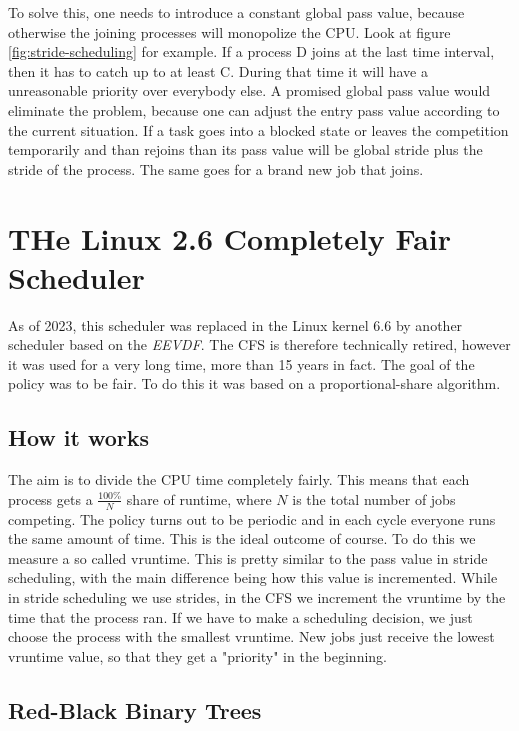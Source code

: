 To solve this, one needs to introduce a constant global pass value, because otherwise the joining processes will monopolize the CPU. 
Look at figure \ref{fig:stride-scheduling} for example.
If a process D joins at the last time interval, then it has to catch up to at least C. During that time it will have a unreasonable priority over everybody else.
A promised global pass value would eliminate the problem, because one can adjust the entry pass value according to the current situation.
If a task goes into a blocked state or leaves the competition temporarily and than rejoins than its pass value will be global stride plus the stride of the process. The same goes for a brand new job that joins.

\newpage

\section{THe Linux 2.6 Completely Fair Scheduler}

As of 2023, this scheduler was replaced in the Linux kernel 6.6 by another scheduler based on the \emph{EEVDF}.
The CFS is therefore technically retired, however it was used for a very long time, more than 15 years in fact.
The goal of the policy was to be fair. To do this it was based on a proportional-share algorithm.

\subsection{How it works}

The aim is to divide the CPU time completely fairly.
This means that each process gets a $\frac{100\%}{N}$ share of runtime, where $N$ is the total number of jobs competing.
The policy turns out to be periodic and in each cycle everyone runs the same amount of time. 
This is the ideal outcome of course.
To do this we measure a so called vruntime.
This is pretty similar to the pass value in stride scheduling, with the main difference being how this value is incremented.
While in stride scheduling we use strides, in the CFS we increment the vruntime by the time that the process ran.
If we have to make a scheduling decision, we just choose the process with the smallest vruntime.
New jobs just receive the lowest vruntime value, so that they get a "priority" in the beginning.

\subsection{Red-Black Binary Trees}

